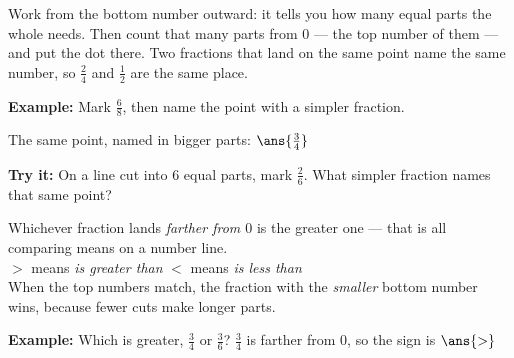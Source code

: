\documentclass[12pt]{article}
\begin{document}

\begin{formulabox}
Work from the bottom number outward: it tells you how many equal parts the
whole needs. Then count that many parts from $0$ --- the top number of them ---
and put the dot there. Two fractions that land on the same point name the same
number, so $\frac{2}{4}$ and $\frac{1}{2}$ are the same place.
\end{formulabox}

\begin{examplebox}
\textbf{Example:} Mark $\frac{6}{8}$, then name the point with a simpler
fraction.
\begin{center}
\end{center}
The same point, named in bigger parts: $\ans{\tfrac{3}{4}}$
\end{examplebox}

\begin{tryitbox}
\textbf{Try it:} On a line cut into $6$ equal parts, mark $\frac{2}{6}$. What
simpler fraction names that same point?\\[2pt]
\end{tryitbox}


\begin{formulabox}
Whichever fraction lands \emph{farther from $0$} is the greater one --- that is
all comparing means on a number line.\\[2pt]
$>$ means \emph{is greater than} \qquad $<$ means \emph{is less than}\\[2pt]
When the top numbers match, the fraction with the \emph{smaller} bottom number
wins, because fewer cuts make longer parts.
\end{formulabox}

\begin{examplebox}
\textbf{Example:} Which is greater, $\frac{3}{4}$ or $\frac{3}{6}$?
$\frac{3}{4}$ is farther from $0$, so the sign is $\ans{>}$
\end{examplebox}
\end{document}
